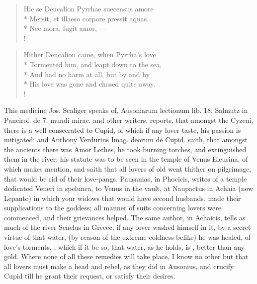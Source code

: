 \begin{latin}
\begin{verse}%
Hic se Deucalion Pyrrhae suecensus amore\\*
Mersit, et illaeso corpore pressit aquas.\\*
Nec mora, fugit amor, \etc{}---\\!
\end{verse}%
\end{latin}
\translationrule%
\begin{verse}%
Hither Deucalion came, when Pyrrha's love\\*
Tormented him, and leapt down to the sea,\\*
And had no harm at all, but by and by\\*
His love was gone and chased quite away.\\!
\end{verse}%
%

This medicine Jos. Scaliger speaks of, \textlatin{Ausoniarum lectionum lib. 18.}
Salmutz in \textlatin{Pancirol. de 7. mundi mirac.} and other writers. \Pliny{}
reports, that amongst the Cyzeni, there is a well consecrated to Cupid,
of which if any lover taste, his passion is mitigated: and Anthony
Verdurius \textlatin{Imag. deorum de Cupid.} saith, that amongst the ancients there
was Amor Lethes, he took burning torches, and extinguished them
in the river; his statute was to be seen in the temple of Venus
Eleusina, of which \Ovid makes mention, and saith that all lovers of old
went thither on pilgrimage, that would be rid of their love-pangs.
Pausanias, in  Phocicis, writes of a temple dedicated Veneri in
spelunca, to Venus in the vault, at Naupactus in Achaia (now Lepanto)
in which your widows that would have second husbands, made their
supplications to the goddess; all manner of suits concerning lovers
were commenced, and their grievances helped. The same author, in
Achaicis, tells as much of the river Senelus in Greece; if any
lover washed himself in it, by a secret virtue of that water, (by
reason of the extreme coldness belike) he was healed, of love's
torments, ; which if it be so,
that water, as he holds, is , better than any gold.
Where none of all these remedies will take place, I know no other but
that all lovers must make a head and rebel, as they did in
Ausonius, and crucify Cupid till he grant their request, or
satisfy their desires.

